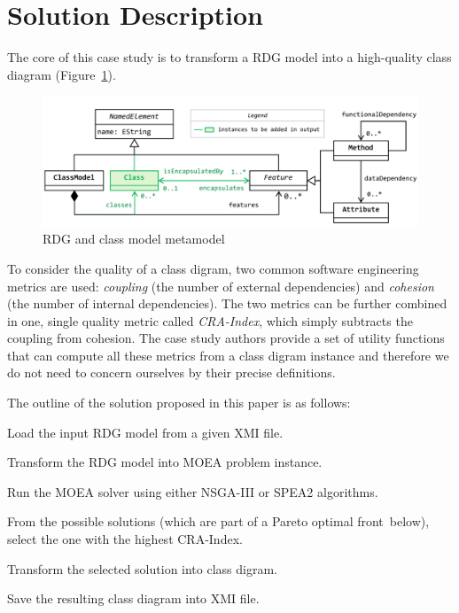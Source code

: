 
\section{Solution Description}
\label{sec:SolutionDescription}

The core of this case study is to transform a RDG model into a high-quality class diagram (\Cf Figure~\ref{fig:Metamodel}).

\begin{figure}[h!tb]
  \centering
  \includegraphics[width=.6\textwidth]{figures/metamodel.pdf}
  \caption{RDG and class model metamodel~\cite{Fleck2016}}
  \label{fig:Metamodel}
\end{figure}

To consider the quality of a class digram, two common software engineering metrics are used: \emph{coupling} (the number of external dependencies) and \emph{cohesion} (the number of internal dependencies).
The two metrics can be further combined in one, single quality metric called \emph{CRA-Index}, which simply subtracts the coupling from cohesion.
The case study authors provide a set of utility functions that can compute all these metrics from a class digram instance and therefore we do not need to concern ourselves by their precise definitions.

The outline of the solution proposed in this paper is as follows:

\begin{compactenum}
  \item Load the input RDG model from a given XMI file.
  \item Transform the RDG model into MOEA problem instance.
  \item Run the MOEA solver using either NSGA-III or SPEA2 algorithms.
  \item From the possible solutions (which are part of a Pareto optimal front~\Cf below), select the one with the highest CRA-Index.
  \item Transform the selected solution into class digram.
  \item Save the resulting class diagram into XMI file.
\end{compactenum}

